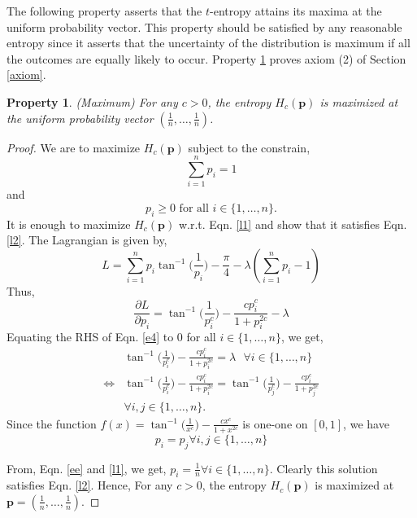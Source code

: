 \documentclass{article}
\newcommand{\bp}{\boldsymbol{p}}
\newtheorem{prop}{Property}
\begin{document}
The following property asserts that the $t$-entropy attains its maxima at the uniform probability vector. This property should be satisfied by any reasonable entropy since it asserts that the uncertainty of the distribution is maximum if all the outcomes are equally likely to occur. Property \ref{p:4} proves axiom (2) of Section \ref{axiom}. 
\begin{prop}
\label{p:4}
(Maximum) For any $c>0$, the entropy $H_c(\bp)$ is maximized at the uniform probability vector $(\frac{1}{n},\dots,\frac{1}{n})$.
\end{prop}
\begin{proof}
We are to maximize $H_c(\bp)$ subject to the constrain,
\begin{equation}\label{l1}
 \sum_{i=1}^n p_i=1   
\end{equation}
 and
 \begin{equation}\label{l2}
    p_i \geq 0 \text{ for all } i \in \{1,\dots,n\}. 
 \end{equation}
 It is enough to maximize $H_c(\bp)$ w.r.t. Eqn. \eqref{l1} and show that it satisfies Eqn. \eqref{l2}. The Lagrangian is given by,
 \begin{equation}\label{e3}
     L=\sum_{i=1}^n p_i \tan^{-1}\bigg(\frac{1}{p_i}\bigg) - \frac{\pi}{4}- \lambda(\sum_{i=1}^n p_i-1)
 \end{equation}
 Thus, 
 \begin{equation}\label{e4}
    \frac{\partial L}{\partial p_i}=\tan^{-1}\bigg(\frac{1}{p_i^c}\bigg)-\frac{c p_i^c}{1+p_i^{2c}}-\lambda 
 \end{equation}
 Equating the RHS of Eqn. \eqref{e4} to $0$ for all $i \in \{1,\dots,n\}$, we get,
 \begin{align*}
    & \tan^{-1}\bigg(\frac{1}{p_i^c}\bigg)-\frac{c p_i^c}{1+p_i^{2c}}=\lambda \text{ } \forall i \in \{1,\dots,n\}\\ 
    \iff & \tan^{-1}\bigg(\frac{1}{p_i^c}\bigg)-\frac{c p_i^c}{1+p_i^{2c}}=\tan^{-1}\bigg(\frac{1}{p_j^c}\bigg)-\frac{c p_i^c}{1+p_j^{2c}}\\ 
  &  \forall i,j \in \{1,\dots,n\}.
  \end{align*}
Since the function $f(x)=\tan^{-1}\bigg(\frac{1}{x^c}\bigg)-\frac{c x^c}{1+x^{2c}}$ is one-one on $[0,1]$, we have
    \begin{equation}\label{ee}
     p_i=p_j \forall i,j \in \{1,\dots,n\}     
    \end{equation}
    
 From, Eqn. \eqref{ee} and \eqref{l1}, we get, $p_i=\frac{1}{n} \forall i \in \{1,\dots,n\} $. Clearly this solution satisfies Eqn. \eqref{l2}. Hence, For any $c>0$, the entropy $H_c(\bp)$ is maximized at $\bp=(\frac{1}{n},\dots,\frac{1}{n})$.
\end{proof}
\end{document}
